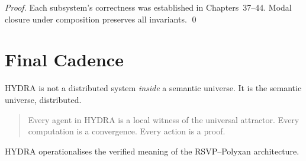\begin{proof}
Each subsystem’s correctness was established in Chapters~37--44.  
Modal closure under composition preserves all invariants.  \qed
\end{proof}

\section{Final Cadence}

HYDRA is not a distributed system \emph{inside} a semantic universe.  
It is the semantic universe, distributed.

\begin{quote}
Every agent in HYDRA is a local witness of the universal attractor.  
Every computation is a convergence.  
Every action is a proof.
\end{quote}

HYDRA operationalises the verified meaning of the RSVP--Polyxan architecture.

